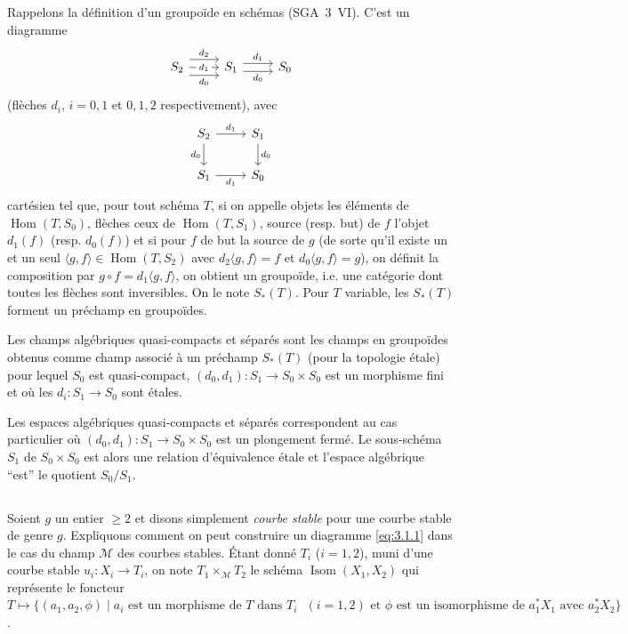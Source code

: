 \documentclass[12pt,a4paper]{article}
\theoremstyle{plain}
\theoremstyle{definition}
\theoremstyle{remark}
\DeclareMathOperator{\Isom}{Isom}
\DeclareMathOperator{\Hom}{Hom}
\begin{document}
\subsection{} Rappelons la définition d'un groupoïde en schémas (SGA~3~VI). C'est un diagramme
\begin{equation}\label{eq:3.1.1}
\begin{tikzcd}
S_2 \arrow[r, shift left=1.5ex, "d_2"] \arrow[r, "d_1"{description}] \arrow[r, shift right=1.5ex, "d_0"'] & S_1 \arrow[r, shift left=0.75ex, "d_1"] \arrow[r, shift right=0.75ex, "d_0"'] & S_0
\end{tikzcd}
\end{equation}
(flèches $d_i$, $i = 0,1$ et $0,1,2$ respectivement), avec
\[
\begin{tikzcd}
S_2 \arrow[r, "d_1"] \arrow[d, "d_0"'] & S_1 \arrow[d, "d_0"] \\
S_1 \arrow[r, "d_1"'] & S_0
\end{tikzcd}
\]
cartésien tel que, pour tout schéma $T$, si on appelle objets les éléments de $\Hom(T,S_0)$, flèches ceux de $\Hom(T,S_1)$, source (resp. but) de $f$ l'objet $d_1(f)$ (resp. $d_0(f)$) et si pour $f$ de but la source de $g$ (de sorte qu'il existe un et un seul $\langle g,f \rangle \in \Hom(T,S_2)$ avec $d_2\langle g,f \rangle = f$ et $d_0\langle g,f \rangle = g$), on définit la composition par $g \circ f = d_1\langle g,f \rangle$, on obtient un groupoïde, i.e. une catégorie dont toutes les flèches sont inversibles. On le note $S_*(T)$. Pour $T$ variable, les $S_*(T)$ forment un préchamp en groupoïdes.

Les champs algébriques quasi-compacts et séparés sont les champs en groupoïdes obtenus comme champ associé à un préchamp $S_*(T)$ (pour la topologie étale) pour lequel $S_0$ est quasi-compact, $(d_0,d_1) : S_1 \to S_0 \times S_0$ est un morphisme fini et où les $d_i : S_1 \to S_0$ sont étales.

Les espaces algébriques quasi-compacts et séparés correspondent au cas particulier où $(d_0,d_1) : S_1 \to S_0 \times S_0$ est un plongement fermé. Le sous-schéma $S_1$ de $S_0 \times S_0$ est alors une relation d'équivalence étale et l'espace algébrique ``est'' le quotient $S_0/S_1$.

\subsection{} Soient $g$ un entier $\geq 2$ et disons simplement \emph{courbe stable} pour une courbe stable de genre $g$. Expliquons comment on peut construire un diagramme \eqref{eq:3.1.1} dans le cas du champ $\mathcal{M}$ des courbes stables. Étant donné $T_i$ ($i = 1,2$), muni d'une courbe stable $u_i : X_i \to T_i$, on note $T_1 \times_{\mathcal{M}} T_2$ le schéma $\Isom(X_1, X_2)$ qui représente le foncteur $T \mapsto \{(a_1, a_2, \phi) \mid a_i \text{ est un morphisme de } T \text{ dans } T_i \text{ } (i = 1,2) \text{ et } \phi \text{ est un isomorphisme de } a_1^* X_1 \text{ avec } a_2^* X_2\}$.
\end{document}
